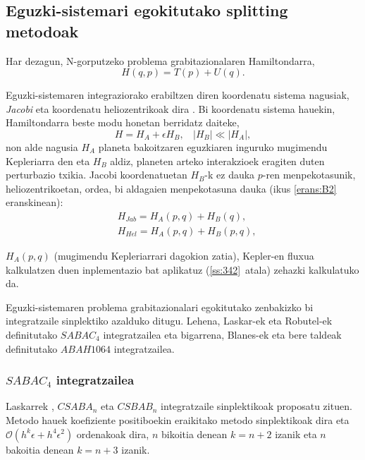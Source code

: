 \subsection{Eguzki-sistemari egokitutako splitting metodoak}

Har dezagun, N-gorputzeko problema grabitazionalaren Hamiltondarra,
\begin{equation*}
H(q,p)=T(p)+U(q).
\end{equation*}

Eguzki-sistemaren integraziorako erabiltzen diren koordenatu sistema nagusiak, \emph{Jacobi} eta koordenatu heliozentrikoak dira \cite{Wisdom2006,Farres2013}.  Bi koordenatu sistema hauekin, Hamiltondarra beste modu honetan berridatz daiteke,
\begin{equation*}
H=H_A+\epsilon H_B,  \ \ \ \ |H_B|\ll|H_A|,
\end{equation*}
non alde nagusia $H_A$ planeta bakoitzaren eguzkiaren inguruko mugimendu Kepleriarra den eta $H_B$ aldiz, planeten arteko interakzioek eragiten duten perturbazio txikia. Jacobi koordenatuetan $H_B$-k ez dauka $p$-ren menpekotasunik, heliozentrikoetan, ordea, bi aldagaien menpekotasuna dauka (ikus \ref{erans:B2} eranskinean):
\begin{align*}
&H_{Jab}=H_A(p,q)+H_B(q), \\
&H_{Hel}=H_A(p,q)+H_B(p,q), 
\end{align*}       

$H_A(p,q)$ (mugimendu Kepleriarrari dagokion zatia), Kepler-en fluxua kalkulatzen duen inplementazio bat aplikatuz (\ref{ss:342}~atala) zehazki kalkulatuko da.

Eguzki-sistemaren problema grabitazionalari egokitutako zenbakizko bi integratzaile sinplektiko azalduko ditugu. Lehena, Laskar-ek eta Robutel-ek \cite{Laskar2001} definitutako \emph{$SABAC_4$} integratzailea eta bigarrena, Blanes-ek eta bere taldeak \cite{Blanes2013,Farres2013} definitutako \emph{$ABAH1064$} integratzailea. 


\subsubsection*{$SABAC_4$ integratzailea}

Laskarrek \cite[$2001$]{Laskar2001}, $CSABA_n$ eta $CSBAB_n$ integratzaile sinplektikoak proposatu zituen. Metodo hauek koefiziente positiboekin eraikitako metodo sinplektikoak dira eta $\mathcal{O}(h^{k} \epsilon+ h^{4} \epsilon^2)$ ordenakoak dira, $n$ bikoitia denean $k=n+2$ izanik eta $n$ bakoitia denean $k=n+3$ izanik. 

